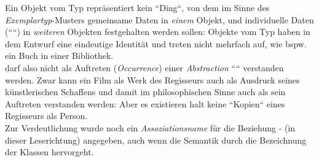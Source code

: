 \noindent
Ein Objekt vom Typ  repräsentiert kein ``Ding``, von dem im Sinne des \textit{Exemplartyp}-Musters gemeinsame Daten in \textit{einem} Objekt, und individuelle Daten (````) in \textit{weiteren} Objekten festgehalten werden sollen: Objekte vom Typ  haben in dem Entwurf eine eindeutige Identität und treten nicht mehrfach auf, wie {bspw.} ein Buch in einer Bibliothek.\\

\noindent
{} darf also nicht als Auftreten (\textit{Occurrence}) einer \textit{Abstraction} ```` verstanden werden. Zwar kann ein Film als Werk des Regisseurs auch als Ausdruck seines künstlerischen Schaffens und damit im philosophischen Sinne auch als sein Auftreten verstanden werden: Aber es existieren halt keine ``Kopien`` eines Regisseurs als Person. \\

\noindent
Zur Verdeutlichung wurde noch ein \textit{Assoziationsname} für die Beziehung  -  (in dieser Leserichtung) angegeben, auch wenn die Semantik durch die Bezeichnung der Klassen hervorgeht.
